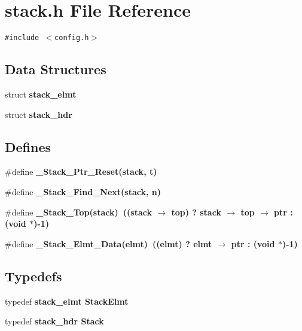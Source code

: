 \section{stack.h File Reference}
\label{stack_8h}
{\tt \#include $<$config.h$>$}\par
\subsection*{Data Structures}
\begin{CompactItemize}
\item 
struct \bf{stack\_\-elmt}
\item 
struct \bf{stack\_\-hdr}
\end{CompactItemize}
\subsection*{Defines}
\begin{CompactItemize}
\item 
\#define \bf{\_\-Stack\_\-Ptr\_\-Reset}(\bf{stack}, t)
\item 
\#define \bf{\_\-Stack\_\-Find\_\-Next}(\bf{stack}, n)
\item 
\#define \bf{\_\-Stack\_\-Top}(\bf{stack})~((\bf{stack} $\rightarrow$ top) ? \bf{stack} $\rightarrow$ top $\rightarrow$ ptr : (void $\ast$)-1)
\item 
\#define \bf{\_\-Stack\_\-Elmt\_\-Data}(elmt)~((elmt) ? elmt $\rightarrow$ ptr : (void $\ast$)-1)
\end{CompactItemize}
\subsection*{Typedefs}
\begin{CompactItemize}
\item 
typedef \bf{stack\_\-elmt} \bf{Stack\-Elmt}
\item 
typedef \bf{stack\_\-hdr} \bf{Stack}
\end{CompactItemize}
